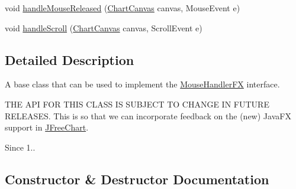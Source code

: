 \begin{DoxyCompactItemize}
\item 
void \mbox{\hyperlink{classorg_1_1jfree_1_1chart_1_1fx_1_1interaction_1_1_abstract_mouse_handler_f_x_af21b170ff087139926d7cca2ac1c7479}{handle\+Mouse\+Released}} (\mbox{\hyperlink{classorg_1_1jfree_1_1chart_1_1fx_1_1_chart_canvas}{Chart\+Canvas}} canvas, Mouse\+Event e)
\item 
void \mbox{\hyperlink{classorg_1_1jfree_1_1chart_1_1fx_1_1interaction_1_1_abstract_mouse_handler_f_x_a1295d12f1bd621599427b782237b9e0c}{handle\+Scroll}} (\mbox{\hyperlink{classorg_1_1jfree_1_1chart_1_1fx_1_1_chart_canvas}{Chart\+Canvas}} canvas, Scroll\+Event e)
\end{DoxyCompactItemize}


\subsection{Detailed Description}
A base class that can be used to implement the \mbox{\hyperlink{interfaceorg_1_1jfree_1_1chart_1_1fx_1_1interaction_1_1_mouse_handler_f_x}{Mouse\+Handler\+FX}} interface.

T\+HE A\+PI F\+OR T\+H\+IS C\+L\+A\+SS IS S\+U\+B\+J\+E\+CT TO C\+H\+A\+N\+GE IN F\+U\+T\+U\+RE R\+E\+L\+E\+A\+S\+ES. This is so that we can incorporate feedback on the (new) Java\+FX support in \mbox{\hyperlink{classorg_1_1jfree_1_1chart_1_1_j_free_chart}{J\+Free\+Chart}}.

\begin{DoxySince}{Since}
1.. 
\end{DoxySince}


\subsection{Constructor \& Destructor Documentation}
\mbox{\label{classorg_1_1jfree_1_1chart_1_1fx_1_1interaction_1_1_abstract_mouse_handler_f_x_a7cee61adb872c016acf112972d053e71}} 
